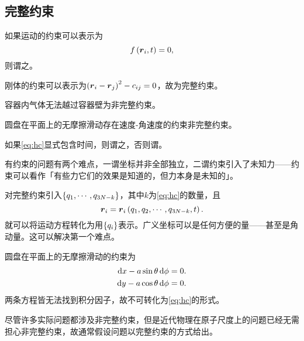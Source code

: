 \documentclass{ctexrep}
\begin{document}
\subsection{完整约束}
如果运动的约束可以表示为
\begin{equation}
\label{eq:hc}
f\left(\boldsymbol{r}_i, t\right) = 0,
\end{equation}
则谓之。
\begin{ex}
  刚体的约束可以表示为$\left(\boldsymbol{r}_i-\boldsymbol{r}_j\right)^2-c_{ij}=0$，故为完整约束。
\end{ex}
\begin{ex}
  容器内气体无法越过容器壁为非完整约束。
\end{ex}
\begin{ex}
  圆盘在平面上的无摩擦滑动存在速度-角速度的约束非完整约束。
\end{ex}
如果\eqref{eq:hc}显式包含时间，则谓之，否则谓。
\par
有约束的问题有两个难点，一谓坐标并非全部独立，二谓约束引入了未知力——约束可以看作「有些力它们的效果是知道的，但力本身是未知的」。
\par
对完整约束引入$\left\{q_1,\cdots,q_{3N-k}\right\}$，其中$k$为\eqref{eq:hc}的数量，且
\[ \boldsymbol{r}_i=\boldsymbol{r}_i\left(q_1,q_2,\cdots,q_{3N-k},t\right). \]
就可以将运动方程转化为用$\left\{q_i\right\}$表示。广义坐标可以是任何方便的量——甚至是角动量。这可以解决第一个难点。
\begin{ex}[广义坐标对非完整约束失效]
  圆盘在平面上的无摩擦滑动的约束为
  \begin{align*}
    \mathrm{d} x-a\sin\theta\,\mathrm{d} \phi&=0.\\
    \mathrm{d} y-a\cos\theta\,\mathrm{d} \phi&=0.
  \end{align*}
  两条方程皆无法找到积分因子，故不可转化为\eqref{eq:hc}的形式。
\end{ex}
尽管许多实际问题都涉及非完整约束，但是近代物理在原子尺度上的问题已经无需担心非完整约束，故通常假设问题以完整约束的方式给出。
\end{document}

